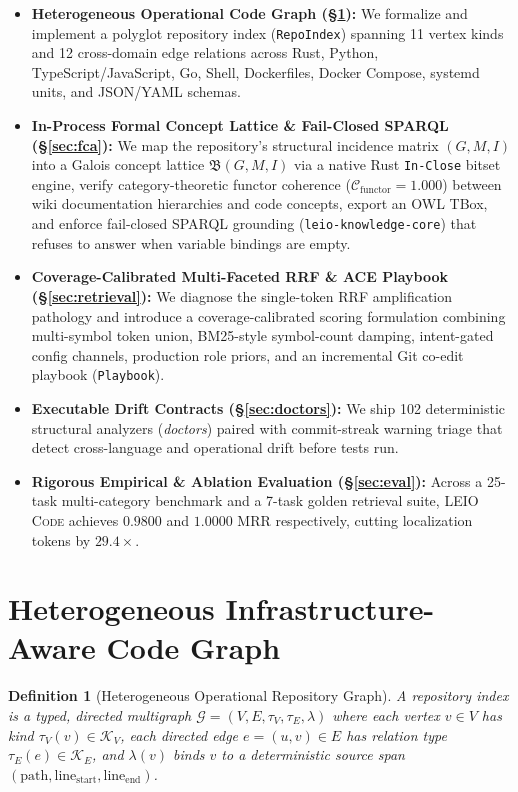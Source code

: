 \documentclass[11pt]{article}
\newtheorem{definition}{Definition}
\begin{document}
\begin{itemize}
    \item \textbf{Heterogeneous Operational Code Graph (\S\ref{sec:graph}):} We formalize and implement a polyglot repository index (\texttt{RepoIndex}) spanning 11 vertex kinds and 12 cross-domain edge relations across Rust, Python, TypeScript/JavaScript, Go, Shell, Dockerfiles, Docker Compose, systemd units, and JSON/YAML schemas.
    \item \textbf{In-Process Formal Concept Lattice \& Fail-Closed SPARQL (\S\ref{sec:fca}):} We map the repository's structural incidence matrix $(G, M, I)$ into a Galois concept lattice $\mathfrak{B}(G, M, I)$ via a native Rust \texttt{In-Close} bitset engine, verify category-theoretic functor coherence ($\mathcal{C}_{\text{functor}} = 1.000$) between wiki documentation hierarchies and code concepts, export an OWL TBox, and enforce fail-closed SPARQL grounding (\texttt{leio-knowledge-core}) that refuses to answer when variable bindings are empty.
    \item \textbf{Coverage-Calibrated Multi-Faceted RRF \& ACE Playbook (\S\ref{sec:retrieval}):} We diagnose the single-token RRF amplification pathology and introduce a coverage-calibrated scoring formulation combining multi-symbol token union, BM25-style symbol-count damping, intent-gated config channels, production role priors, and an incremental Git co-edit playbook (\texttt{Playbook}).
    \item \textbf{Executable Drift Contracts (\S\ref{sec:doctors}):} We ship 102 deterministic structural analyzers (\emph{doctors}) paired with commit-streak warning triage that detect cross-language and operational drift before tests run.
    \item \textbf{Rigorous Empirical \& Ablation Evaluation (\S\ref{sec:eval}):} Across a 25-task multi-category benchmark and a 7-task golden retrieval suite, \textsc{LEIO Code} achieves $0.9800$ and $1.0000$ MRR respectively, cutting localization tokens by $29.4\times$.
\end{itemize}

\section{Heterogeneous Infrastructure-Aware Code Graph}
\label{sec:graph}

\begin{definition}[Heterogeneous Operational Repository Graph]
A repository index is a typed, directed multigraph $\mathcal{G} = (V, E, \tau_V, \tau_E, \lambda)$ where each vertex $v \in V$ has kind $\tau_V(v) \in \mathcal{K}_V$, each directed edge $e = (u, v) \in E$ has relation type $\tau_E(e) \in \mathcal{K}_E$, and $\lambda(v)$ binds $v$ to a deterministic source span $(\text{path}, \text{line}_{\text{start}}, \text{line}_{\text{end}})$.
\end{definition}
\end{document}
